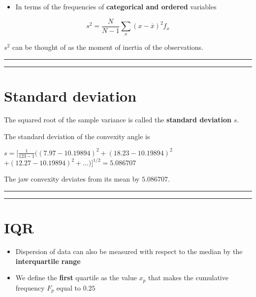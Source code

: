 \documentclass[
]{book}
\providecommand{\tightlist}{%
  \setlength{\itemsep}{0pt}\setlength{\parskip}{0pt}}
\begin{document}
\begin{itemize}
\tightlist
\item
  In terms of the frequencies of \textbf{categorical and ordered} variables
\end{itemize}

\[s^2=\frac{N}{N-1} \sum_{x} (x-\bar{x})^2 f_x\]

\(s^2\) can be thought of as the moment of inertia of the observations.

\begin{center}\rule{0.5\linewidth}{0.5pt}\end{center}

\begin{center}\rule{0.5\linewidth}{0.5pt}\end{center}

\hypertarget{standard-deviation}{%
\section{Standard deviation}\label{standard-deviation}}

The squared root of the sample variance is called the \textbf{standard deviation} \(s\).

The standard deviation of the convexity angle is

\(s= [\frac{1}{123-1}((7.97-10.19894)^2+ (18.23-10.19894)^2\)\\
\(+ (12.27-10.19894)^2 + ...)]^{1/2} = 5.086707\)

The jaw convexity deviates from its mean by \(5.086707\).

\begin{center}\rule{0.5\linewidth}{0.5pt}\end{center}

\begin{center}\rule{0.5\linewidth}{0.5pt}\end{center}

\hypertarget{iqr}{%
\section{IQR}\label{iqr}}

\begin{itemize}
\item
  Dispersion of data can also be measured with respect to the median by the \textbf{interquartile range}
\item
  We define the \textbf{first} quartile as the value \(x_p\) that makes the cumulative frequency \(F_p\) equal to \(0.25\)
\end{itemize}
\end{document}
